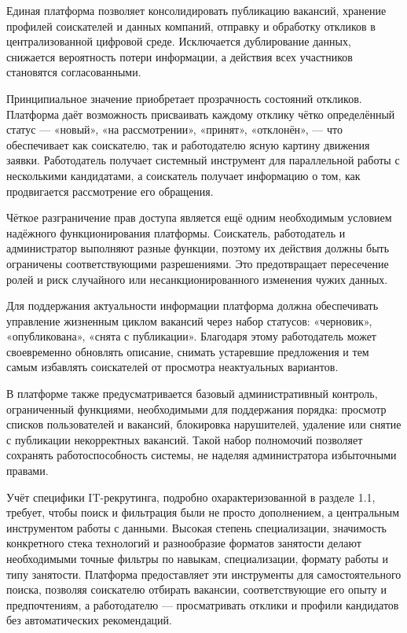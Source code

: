 Единая платформа позволяет консолидировать публикацию вакансий, хранение профилей соискателей и данных компаний, отправку и обработку откликов в централизованной цифровой среде. Исключается дублирование данных, снижается вероятность потери информации, а действия всех участников становятся согласованными.

Принципиальное значение приобретает прозрачность состояний откликов. Платформа даёт возможность присваивать каждому отклику чётко определённый статус --- «новый», «на рассмотрении», «принят», «отклонён», --- что обеспечивает как соискателю, так и работодателю ясную картину движения заявки. Работодатель получает системный инструмент для параллельной работы с несколькими кандидатами, а соискатель получает информацию о том, как продвигается рассмотрение его обращения.

Чёткое разграничение прав доступа является ещё одним необходимым условием надёжного функционирования платформы. Соискатель, работодатель и администратор выполняют разные функции, поэтому их действия должны быть ограничены соответствующими разрешениями. Это предотвращает пересечение ролей и риск случайного или несанкционированного изменения чужих данных.

Для поддержания актуальности информации платформа должна обеспечивать управление жизненным циклом вакансий через набор статусов: «черновик», «опубликована», «снята с публикации». Благодаря этому работодатель может своевременно обновлять описание, снимать устаревшие предложения и тем самым избавлять соискателей от просмотра неактуальных вариантов.

В платформе также предусматривается базовый административный контроль, ограниченный функциями, необходимыми для поддержания порядка: просмотр списков пользователей и вакансий, блокировка нарушителей, удаление или снятие с публикации некорректных вакансий. Такой набор полномочий позволяет сохранять работоспособность системы, не наделяя администратора избыточными правами.

Учёт специфики IT-рекрутинга, подробно охарактеризованной в разделе 1.1, требует, чтобы поиск и фильтрация были не просто дополнением, а центральным инструментом работы с данными. Высокая степень специализации, значимость конкретного стека технологий и разнообразие форматов занятости делают необходимыми точные фильтры по навыкам, специализации, формату работы и типу занятости. Платформа предоставляет эти инструменты для самостоятельного поиска, позволяя соискателю отбирать вакансии, соответствующие его опыту и предпочтениям, а работодателю --- просматривать отклики и профили кандидатов без автоматических рекомендаций.

